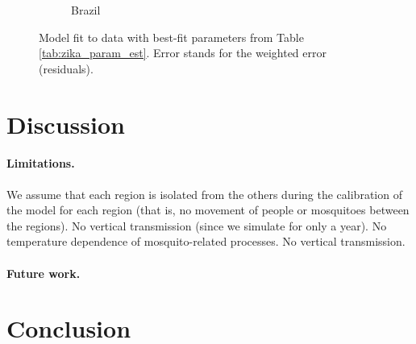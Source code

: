 \documentclass[10pt,letterpaper]{article}
\begin{document}
\begin{figure}
\begin{subfigure}[b]{0.3\textwidth}
         \caption{Brazil}
         \label{fig:brazil_PE}
     \end{subfigure}
        \caption{Model fit to data with best-fit parameters from Table \ref{tab:zika_param_est}. Error stands for the weighted error (residuals).}
        \label{fig:PE_figs}
\end{figure}

        

\section*{Discussion}
\paragraph{Limitations.} We assume that each region is isolated from the others during the calibration of the model for each region (that is, no movement of people or mosquitoes between the regions). No vertical transmission (since we simulate for only a year). No temperature dependence of mosquito-related processes. No vertical transmission.
\paragraph{Future work.} 

\section*{Conclusion}
\end{document}
